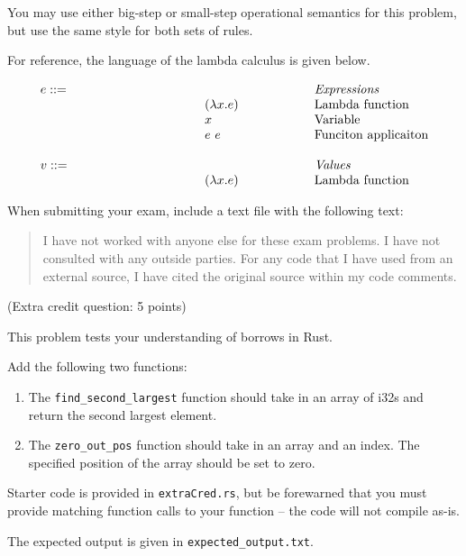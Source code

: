 \documentclass[addpoints]{exam}
\newcommand{\mydefhead}[2]{\multicolumn{2}{l}{{#1}}&\mbox{\emph{#2}}\\}
\newcommand{\mydefcase}[2]{\qquad\qquad\qquad\qquad\qquad\qquad& #1 &\mbox{#2}\\}
\begin{document}
\begin{questions}
You may use either big-step or small-step operational semantics for this problem,
but use the same style for both sets of rules.

For reference, the language of the lambda calculus is given below.

\newcommand{\lamexp}[2]{(\lambda{#1}.{#2})}
\newcommand{\varexp}[1]{#1}
\newcommand{\appexp}[2]{#1~#2}

\[
  \begin{array}{ll@{\qquad\qquad\qquad}l}
  \mydefhead{e ::=}{Expressions}
    \mydefcase{\lamexp{x}{e}}{Lambda function}
    \mydefcase{\varexp{x}}{Variable}
    \mydefcase{\appexp{e}{e}}{Funciton applicaiton}
  \\
    \mydefhead{v ::=\qquad\qquad\qquad\qquad}{Values}
    \mydefcase{\lamexp{x}{e}}{Lambda function}
\end{array}
\]

\vskip 1in

\question[10]
When submitting your exam, include a text file with the following text:

\begin{quote}
  I have not worked with anyone else for these exam problems.
  I have not consulted with any outside parties.  For any code
  that I have used from an external source, I have cited the
  original source within my code comments.
\end{quote}

\vskip 1in

\question[0]
(Extra credit question: 5 points)

This problem tests your understanding of borrows in Rust.

Add the following two functions:

\begin{enumerate}
  \item The {\tt find\_second\_largest} function should take in an array of i32s and return the second largest element.

  \item The {\tt zero\_out\_pos} function should take in an array and an index.  The specified position of the array should be set to zero.
\end{enumerate}

Starter code is provided in {\tt extraCred.rs}, but be forewarned that you must provide matching function calls to your function -- the code will not compile as-is.

The expected output is given in {\tt expected\_output.txt}.





\end{questions}
\end{document}
